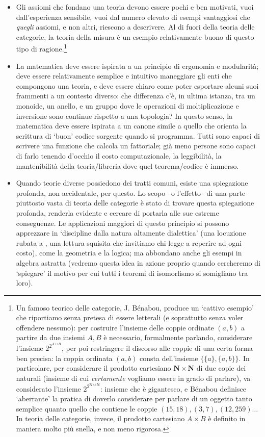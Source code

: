\begin{itemize}
	\item Gli assiomi che fondano una teoria devono essere pochi e ben motivati, vuoi dall'esperienza sensibile, vuoi dal numero elevato di esempi vantaggiosi che \emph{quegli} assiomi, e non altri, riescono a descrivere. Al di fuori della teoria delle categorie, la teoria della misura è un esempio relativamente buono di questo tipo di ragione.\footnote{Un famoso teorico delle categorie, J. Bénabou, produce un `cattivo esempio' che riportiamo senza pretesa di essere letterali (e soprattutto senza voler offendere nessuno): per costruire l'insieme delle coppie ordinate \((a,b)\) a partire da due insiemi \(A,B\) è necessario, formalmente parlando, considerare l'insieme \(2^{2^{A\cup B}}\), per poi restringere il discorso alle coppie di una certa forma ben precisa: la coppia ordinata \((a,b)\) consta dell'insieme \(\{\{a\},\{a,b\}\}\). In particolare, per considerare il prodotto cartesiano \(\mathbf{N} \times \mathbf{N}\) di due copie dei naturali (insieme di cui \emph{certamente} vogliamo essere in grado di parlare), va considerato l'insieme \(2^{2^{\mathbf{N} \cup \mathbf{N}}}\): insieme che è gigantesco, e Bénabou definisce `aberrante' la pratica di doverlo considerare per parlare di un oggetto tanto semplice quanto quello che contiene le coppie \((15,18), (3,7), (12, 259)\dots\) In teoria delle categorie, invece, il prodotto cartesiano \(A\times B\) è definito in maniera molto più snella, e non meno rigorosa.}
	\item La matematica deve essere ispirata a un principio di ergonomia e modularità; deve essere relativamente semplice e intuitivo maneggiare gli enti che compongono una teoria, e deve essere chiaro come poter esportare alcuni suoi frammenti a un contesto diverso: che differenza c'è, in ultima istanza, tra un monoide, un anello, e un gruppo dove le operazioni di moltiplicazione e inversione sono continue rispetto a una topologia? In questo senso, la matematica deve essere ispirata a un canone simile a quello che orienta la scrittura di `buon' codice sorgente quando si programma. Tutti sono capaci di scrivere una funzione che calcola un fattoriale; già meno persone sono capaci di farlo tenendo d'occhio il costo computazionale, la leggibilità, la mantenibilità della teoria/libreria dove quel teorema/codice è immerso.
	\item Quando teorie diverse possiedono dei tratti comuni, esiste una spiegazione profonda, non accidentale, per questo. Lo scopo --o l'effetto-- di una parte piuttosto vasta di teoria delle categorie è stato di trovare questa spiegazione profonda, renderla evidente e cercare di portarla alle sue estreme conseguenze. Le applicazioni maggiori di questo principio si possono apprezzare in `discipline dalla natura altamente dialettica' (una locuzione rubata a \cite{lawvere1999profilo}, una lettura squisita che invitiamo chi legge a reperire ad ogni costo), come la geometria e la logica; ma abbondano anche gli esempi in algebra astratta (vedremo questa idea in azione proprio quando cercheremo di `spiegare' il motivo per cui tutti i teoremi di isomorfismo si somigliano tra loro).

\end{itemize}
